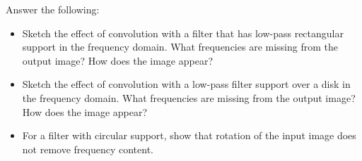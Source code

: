 \documentclass[11pt]{article}
\begin{document}
	Answer the following:
	
	\begin{itemize}
		
		\item Sketch the effect of convolution with a filter that has low-pass rectangular support in the frequency domain. What frequencies are missing from the output image? How does the image appear?
		
		\item Sketch the effect of convolution with a low-pass filter support over a disk in the frequency domain. What frequencies are missing from the output image? How does the image appear?
		
		\item For a filter with circular support, show that rotation of the input image does not remove frequency content.
		
	\end{itemize}
	
\end{document}
